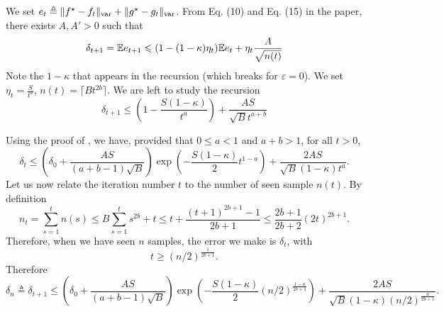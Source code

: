 \documentclass[a4paper, 10pt]{article}
\begin{document}
We set $e_t \triangleq \Vert f^\star - f_t \Vert_{\text{var}} + \Vert g^\star - g_t \Vert_{\text{var}}$.
From Eq. (10) and Eq. (15) in the paper, there exists $A, A' >0$ such that
\begin{align}
    \delta_{t+ 1} = \mathbb{E} e_{t+1} &\leqslant (1 - (1 - \kappa) \eta_t) \mathbb{E} e_t + \eta_t 
    \frac{A}{\sqrt{n(t)}} \\
\end{align}
Note the $1 - \kappa$ that appears in the recursion 
(which breaks for $\varepsilon = 0$). We
set $\eta_t = \frac{S}{t^a}$, $n(t) = \lceil B t^{2b} \rceil$. We are left to study the recursion
\begin{equation}
    \delta_{t+1} \leq (1 - \frac{S(1 - \kappa)}{t^a}) + 
    \frac{A S}{\sqrt{B}{t^{a + b}}}
\end{equation}

Using the proof of \citep[Theorem 2]{moulines_non-asymptotic_2011}, we have,
provided that $0 \leq a < 1$ and $a+ b > 1$, for all $t > 0$,
\begin{equation}
    \delta_t \leq (\delta_0 + \frac{A S}{(a + b - 1)\sqrt{B}})
    \exp(- \frac{S(1 - \kappa)}{2} t^{1 - a})
    + \frac{2 A S}{\sqrt{B}(1 - \kappa) t^a}.
\end{equation}
Let us now relate the iteration number $t$ to the number of seen sample $n(t)$. By definition
\begin{equation}
    n_t = \sum_{s=1}^t n(s) \leq B \sum_{s=1}^t s^{2b} + t \leq
     t + \frac{(t+1)^{2b + 1} - 1}{2b + 1}
     \leq \frac{2b + 1}{2b + 2} (2t)^{2b+1}.
\end{equation}
Therefore, when we have seen $n$ samples, the error we make is $\delta_t$, with
\begin{equation}
    t \geq {(n/2)}^{\frac{1}{2b + 1}}.
\end{equation}
Therefore
\begin{equation}
    \delta_n \triangleq \delta_{t+1} \leq 
    (\delta_0 + \frac{A S}{(a + b - 1)\sqrt{B}})
    \exp(- \frac{S(1 - \kappa)}{2} {(n /2)}^{\frac{1 - a}{2b+1}})
    + \frac{2 A S}{\sqrt{B}(1 - \kappa) {(n/2)}^{\frac{a}{2b+1}}}.
\end{equation}
\end{document}

